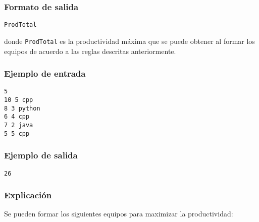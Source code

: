 \subsubsection*{Formato de salida}

\begin{verbatim}
ProdTotal
\end{verbatim}

donde \texttt{ProdTotal} es la productividad máxima que se puede obtener al formar los equipos de acuerdo a las reglas descritas anteriormente.

\subsubsection*{Ejemplo de entrada}

\begin{verbatim}
5
10 5 cpp
8 3 python
6 4 cpp
7 2 java
5 5 cpp
\end{verbatim}

\subsubsection*{Ejemplo de salida}

\begin{verbatim}
26
\end{verbatim}

\subsubsection*{Explicación}


Se pueden formar los siguientes equipos para maximizar la productividad:

